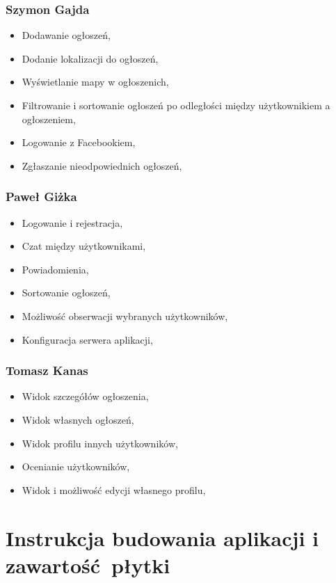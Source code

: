 \documentclass[licencjacka]{pracamgr}
\begin{document}
\subsection{Szymon Gajda}
\begin{itemize}
\setlength\itemsep{-0.2em}
    \item Dodawanie ogłoszeń,
    \item Dodanie lokalizacji do ogłoszeń,
    \item Wyświetlanie mapy w ogłoszenich,
    \item Filtrowanie i sortowanie ogłoszeń po odległości między użytkownikiem a ogłoszeniem,
    \item Logowanie z Facebookiem,
    \item Zgłaszanie nieodpowiednich ogłoszeń,
\end{itemize}{}

\subsection{Paweł Giżka}
\begin{itemize}
\setlength\itemsep{-0.2em}
    \item Logowanie i rejestracja,
    \item Czat między użytkownikami,
    \item Powiadomienia,
    \item Sortowanie ogłoszeń,
    \item Możliwość obserwacji wybranych użytkowników,
    \item Konfiguracja serwera aplikacji,
\end{itemize}{}

\subsection{Tomasz Kanas}
\begin{itemize}
\setlength\itemsep{-0.2em}
    \item Widok szczegółów ogłoszenia,
    \item Widok własnych ogłoszeń,
    \item Widok profilu innych użytkowników,
    \item Ocenianie użytkowników,
    \item Widok i możliwość edycji własnego profilu,
\end{itemize}{}

\chapter{Instrukcja budowania aplikacji i zawartość płytki}\label{r:build}
\end{document}
